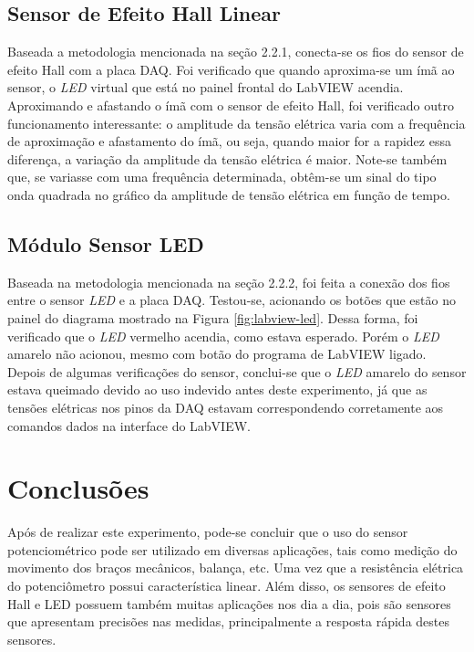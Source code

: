 \documentclass[a4paper]{instrumentacao}
\begin{document}


\section{Sensor de Efeito Hall Linear}
Baseada a metodologia mencionada na seção 2.2.1, conecta-se os fios do sensor de efeito Hall com a placa DAQ. Foi verificado que quando aproxima-se um ímã ao sensor, o \textit{LED} virtual que está no painel frontal do LabVIEW acendia. Aproximando e afastando o ímã com o sensor de efeito Hall, foi verificado outro funcionamento interessante: o amplitude da tensão elétrica varia com a frequência de aproximação e afastamento do ímã, ou seja, quando maior for a rapidez essa diferença, a variação da amplitude
da tensão elétrica é maior. Note-se também que, se variasse com uma frequência determinada, obtêm-se um sinal do tipo onda quadrada no gráfico da amplitude de tensão elétrica em função de tempo.

\section{Módulo Sensor LED}
Baseada na metodologia mencionada na seção 2.2.2, foi feita a conexão dos fios  entre o sensor \textit{LED} e a placa DAQ. Testou-se, acionando os botões que estão no painel do diagrama mostrado na Figura \ref{fig:labview-led}. Dessa forma, foi verificado que o \textit{LED} vermelho acendia, como estava esperado. Porém o \textit{LED} amarelo não acionou, mesmo com botão do programa de LabVIEW ligado. Depois de algumas verificações do sensor, conclui-se que o \textit{LED} amarelo do sensor estava queimado devido ao uso indevido antes deste experimento, já que as tensões elétricas nos pinos da DAQ estavam correspondendo corretamente aos comandos dados na interface do LabVIEW.

\chapter{Conclusões}

Após de realizar este experimento, pode-se concluir que o uso do sensor potenciométrico pode ser utilizado em diversas aplicações, tais como medição do movimento dos braços mecânicos, balança, etc. Uma vez que a resistência elétrica do potenciômetro possui característica linear. Além disso, os sensores de efeito Hall e LED possuem também muitas aplicações nos dia a dia, pois são sensores que apresentam precisões nas medidas, principalmente a resposta rápida destes sensores.
\end{document}

